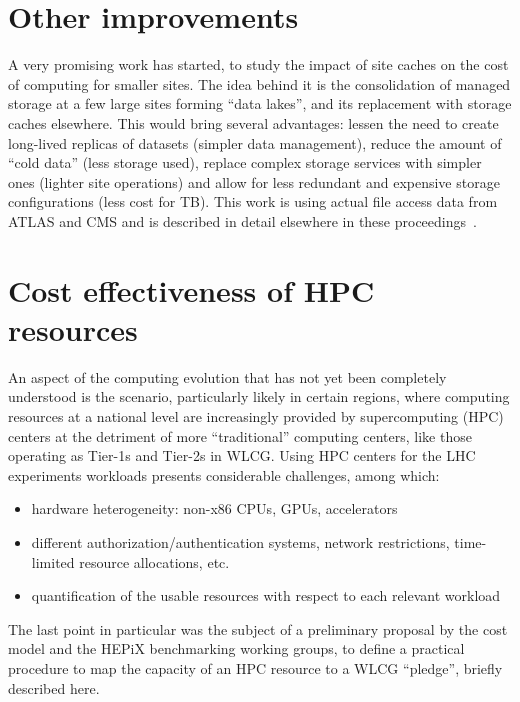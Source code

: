 \section{Other improvements}
A very promising work has started, to study the impact of site caches
on the cost of computing for smaller sites. The idea
behind it is the consolidation of managed storage at a few large sites
forming ``data lakes'', and its replacement with storage caches
elsewhere. This would bring several advantages: lessen the need to
create long-lived replicas of datasets (simpler data management),
reduce the amount of ``cold data'' (less storage used), replace
complex storage services with simpler ones (lighter site operations)
and allow for less redundant and expensive storage configurations
(less cost for TB). This work is using actual file access data from
ATLAS and CMS and is described in detail elsewhere in these
proceedings~\cite{cache}.

\section{Cost effectiveness of HPC resources}
An aspect of the computing evolution that has not yet been completely
understood is the scenario, particularly likely in certain regions,
where computing resources at a national level are increasingly
provided by supercomputing (HPC) centers at the detriment of more
``traditional'' computing centers, like those operating as Tier-1s and
Tier-2s in WLCG. Using HPC centers for the LHC experiments workloads
presents considerable challenges, among which:
\begin{itemize}
\item hardware heterogeneity: non-x86 CPUs, GPUs, accelerators
\item different authorization/authentication systems, network
  restrictions, time-limited resource allocations, etc.
\item quantification of the usable resources with respect to each
  relevant workload
\end{itemize}

The last point in particular was the subject of a preliminary proposal
by the cost model and the HEPiX benchmarking working groups, to define
a practical procedure to map the capacity of an HPC resource to a WLCG
``pledge'', briefly described here.

